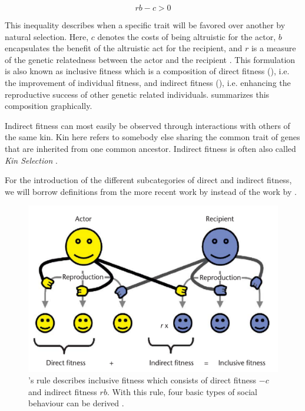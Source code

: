 \documentclass[sigconf]{acmart}
\begin{document}
    \begin{equation}
        rb-c>0\label{eq:rb-c}
    \end{equation}


    This inequality describes when a specific trait will be favored over another by natural selection.
    Here, $c$ denotes the costs of being altruistic for the actor, $b$ encapsulates the benefit of the altruistic act for the recipient, and $r$ is a measure of the genetic relatedness between the actor and the recipient \cite{west_altruism_2010}.
    This formulation is also known as inclusive fitness which is a composition of direct fitness (), i.e. the improvement of individual fitness, and indirect fitness (), i.e. enhancing the reproductive success of other genetic related individuals.
     summarizes this composition graphically.

    Indirect fitness can most easily be observed through interactions with others of the same kin.
    Kin here refers to somebody else sharing the common trait of genes that are inherited from one common ancestor.
    Indirect fitness is often also called \textit{Kin Selection} \cite{west_altruism_2010}.

    For the introduction of the different subcategories of direct and indirect fitness, we will borrow definitions from the more recent work by \citeauthor{west_altruism_2010} \cite{west_altruism_2010} instead of the work by \citeauthor{gardner_theory_2009} \cite{gardner_theory_2009}.

    \begin{figure}
        \includegraphics[width=\columnwidth]{figures/hamiltons_rule}
        \caption{\citeauthor{hamilton_kin_1964}'s rule describes inclusive fitness which consists of direct fitness $-c$ and indirect fitness $rb$. With this rule, four basic types of social behaviour can be derived \cite{gardner_theory_2009}.}
        \label{fig:hamilton}
    \end{figure}
\end{document}
